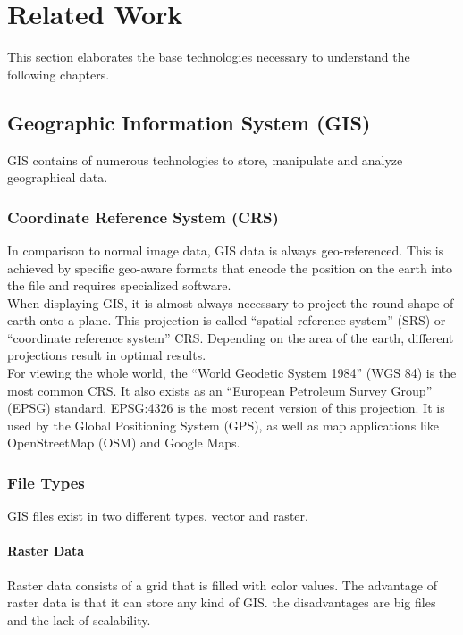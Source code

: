 
\chapter{Related Work}
This section elaborates the base technologies necessary to understand the following chapters.


\section{Geographic Information System (GIS)}
GIS contains of numerous technologies to store, manipulate and analyze geographical data. 


\subsection{Coordinate Reference System (CRS)}
In comparison to normal image data, GIS data is always geo-referenced. This is achieved by specific geo-aware formats that encode the position on the earth into the file and requires specialized software.\\
When displaying GIS, it is almost always necessary to project the round shape of earth onto a plane. This projection is called \enquote{spatial reference system} (SRS) or  \enquote{coordinate reference system} CRS. Depending on the area of the earth, different projections result in optimal results.\\
For viewing the whole world, the \enquote{World Geodetic System 1984} (WGS 84) is the most common CRS. It also exists as an \enquote{European Petroleum Survey Group}  (EPSG) standard. EPSG:4326 is the most recent version of this projection. It is used by the Global Positioning System (GPS), as well as map applications like OpenStreetMap (OSM) and Google Maps.


\subsection{File Types}
GIS files exist in two different types. vector and raster.

\subsubsection{Raster Data}
 Raster data consists of a grid that is filled with color values. The advantage of raster data is that it can store any kind of GIS. the disadvantages are big files and the lack of scalability.

